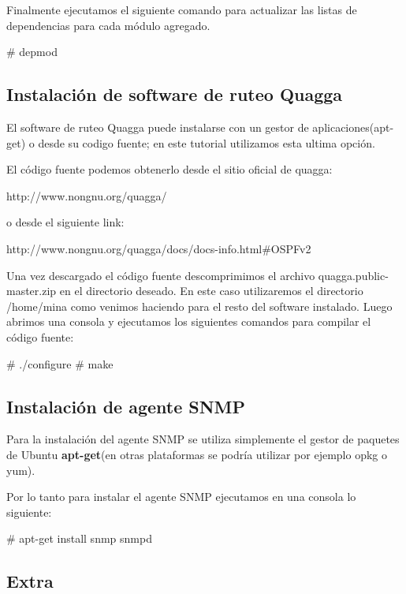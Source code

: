 Finalmente ejecutamos el siguiente comando para actualizar las listas de dependencias para cada módulo agregado.

\begin{bash}
# depmod
\end{bash}

\subsection{Instalación de software de ruteo Quagga}
El software de ruteo Quagga puede instalarse con un gestor de aplicaciones(apt-get) o desde su codigo fuente; en este tutorial utilizamos esta ultima opción. 

El código fuente podemos obtenerlo desde el sitio oficial de quagga:

\begin{center}
http://www.nongnu.org/quagga/
\end{center}
 
o desde el siguiente link:

\begin{center}
http://www.nongnu.org/quagga/docs/docs-info.html\#OSPFv2
\end{center}

Una vez descargado el código fuente descomprimimos el archivo quagga.public-master.zip en el directorio deseado. En este caso utilizaremos el directorio /home/mina como venimos haciendo para el resto del software instalado. Luego abrimos una consola y ejecutamos los siguientes comandos para compilar el código fuente:

\begin{bash}
# ./configure
# make 
\end{bash}

\subsection{Instalaci\'on de agente SNMP}
Para la instalaci\'on del agente SNMP se utiliza simplemente el gestor de paquetes de Ubuntu \textbf{apt-get}(en otras plataformas se podr\'ia utilizar por ejemplo opkg o yum).

Por lo tanto para instalar el agente SNMP ejecutamos en una consola lo siguiente:

\begin{bash}
# apt-get install snmp snmpd
\end{bash}

\subsection{Extra}

